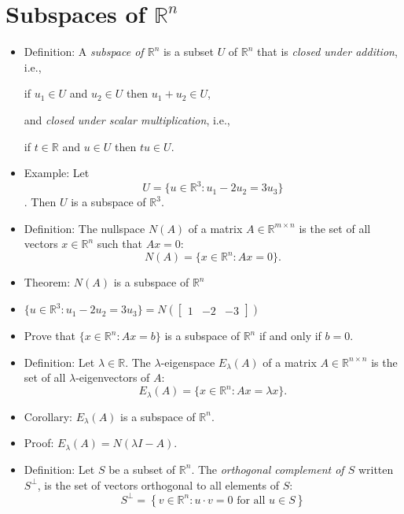 \documentclass{amsart}
\newcommand{\RR}{\mathbb{R}}
\begin{document}
\section{Subspaces of $\RR^n$}
\begin{itemize}
  \setlength{\itemsep}{0.5em}
  \item Definition: A \emph{subspace of $\RR^n$} is a subset $U$ of $\RR^n$ that is \emph{closed under addition}, i.e.,
  \begin{center}
    if $u_1\in U$ and $u_2\in U$ then $u_1+u_2\in U$,
  \end{center}
  and \emph{closed under scalar multiplication}, i.e.,
  \begin{center}
  if $t\in \RR$ and $u\in U$ then $tu\in U$.
  \end{center}

  \item Example: Let $$U=\{u\in \RR^3 : u_1-2u_2=3u_3\}$$.
  Then $U$ is a subspace of $\RR^3$.

  \item Definition: The nullspace $N(A)$ of a matrix $A\in\RR^{m\times n}$ is the set of all vectors $x\in\RR^n$ such that $Ax=0$:
  $$N(A) = \{x\in\RR^n : Ax=0\}.$$ 

  \item Theorem: $N(A)$ is a subspace of $\RR^n$

\item $\{u\in \RR^3 : u_1-2u_2=3u_3\} = N\left(\begin{bmatrix}1&-2&-3\end{bmatrix}\right)$

  \item Prove that $\{x\in\RR^n : Ax=b\}$ is a subspace of $\RR^n$ if and only if $b=0$.

  \item Definition: Let $\lambda\in \RR$. The {$\lambda$-eigenspace $E_\lambda(A)$} of a matrix $A\in\RR^{n\times n}$ is the set of all $\lambda$-eigenvectors of $A$:
  $$E_\lambda(A) = \{x\in\RR^n: Ax = \lambda x\}.$$

\item Corollary: $E_\lambda(A)$ is a subspace of $\RR^n$.

\item Proof: $E_\lambda(A) = N(\lambda I - A)$.

\item Definition: Let $S$ be a subset of $\RR^n$.
The \emph{orthogonal complement of $S$} written $S^\perp$, is the set of vectors orthogonal to all elements of $S$:
$$S^\perp = \left\{v\in\RR^n : \text{$u\cdot v = 0$ for all $u\in S$}
\right\}$$


\end{itemize}
\end{document}
